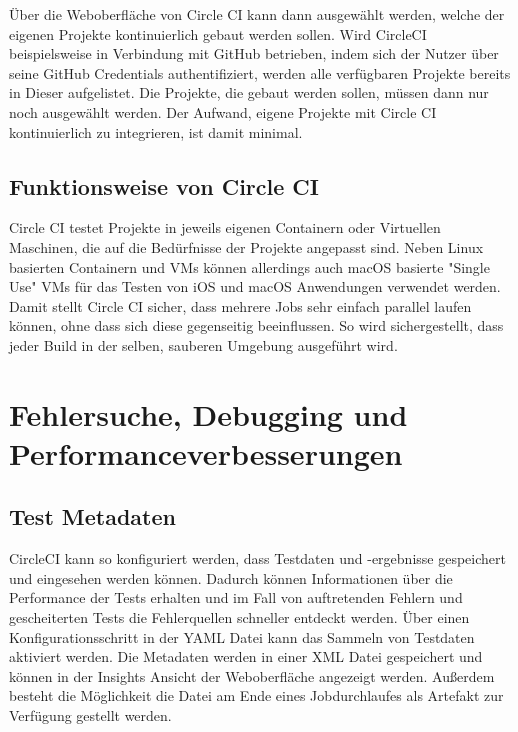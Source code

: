 \documentclass[11pt]{article}
\begin{document}
Über die Weboberfläche von Circle CI kann dann ausgewählt werden, welche der eigenen Projekte
kontinuierlich gebaut werden sollen. Wird CircleCI beispielsweise in Verbindung mit GitHub betrieben,
indem sich der Nutzer über seine GitHub Credentials authentifiziert, werden alle verfügbaren Projekte
bereits in Dieser aufgelistet. Die Projekte, die gebaut werden sollen, müssen dann nur noch ausgewählt
werden. Der Aufwand, eigene Projekte mit Circle CI kontinuierlich zu integrieren, ist damit minimal. 

\subsection{Funktionsweise von Circle CI}
Circle CI testet Projekte in jeweils eigenen Containern oder Virtuellen Maschinen, die auf die Bedürfnisse
der Projekte angepasst sind. Neben Linux basierten Containern und VMs können allerdings auch macOS
basierte "Single Use" VMs für das Testen von iOS und macOS Anwendungen verwendet werden.
Damit stellt Circle CI sicher, dass mehrere Jobs sehr einfach parallel laufen können, ohne dass sich
diese gegenseitig beeinflussen. So wird sichergestellt, dass jeder Build in der selben, sauberen
Umgebung ausgeführt wird.

\section{Fehlersuche, Debugging und Performanceverbesserungen}
\subsection{Test Metadaten}
CircleCI kann so konfiguriert werden, dass Testdaten und -ergebnisse gespeichert und eingesehen werden können.
Dadurch können Informationen über die Performance der Tests erhalten und im Fall von auftretenden Fehlern und 
gescheiterten Tests die Fehlerquellen schneller entdeckt werden. Über einen Konfigurationsschritt in der 
YAML Datei kann das Sammeln von Testdaten aktiviert werden. Die Metadaten werden in einer XML Datei gespeichert 
und können in der Insights Ansicht der Weboberfläche angezeigt werden. Außerdem besteht die Möglichkeit die 
Datei am Ende eines Jobdurchlaufes als Artefakt zur Verfügung gestellt werden.
\end{document}
